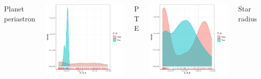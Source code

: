 \documentclass[compress]{beamer}
\begin{document}
\begin{frame}
\begin{columns}[t]
        \begin{center}
        Planet periastron\\
        \end{center}
        \includegraphics[width=\linewidth]{Pic/Density/P_T_E.pdf}
        \begin{center}
        P T E\\
        \end{center}
        \includegraphics[width=\linewidth]{Pic/Density/S_R_E.pdf}
        \begin{center}
        Star radius\\
        \end{center}
    \end{columns}
\end{frame}
\end{document}
